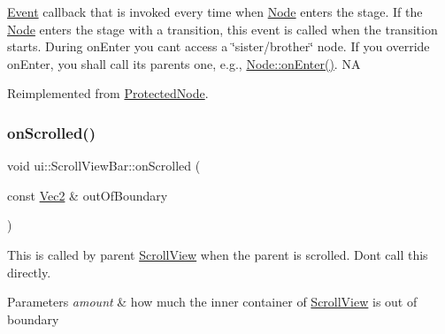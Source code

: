 \hyperlink{classEvent}{Event} callback that is invoked every time when \hyperlink{classNode}{Node} enters the \textquotesingle{}stage\textquotesingle{}. If the \hyperlink{classNode}{Node} enters the \textquotesingle{}stage\textquotesingle{} with a transition, this event is called when the transition starts. During on\+Enter you can\textquotesingle{}t access a \char`\"{}sister/brother\char`\"{} node. If you override on\+Enter, you shall call its parent\textquotesingle{}s one, e.\+g., \hyperlink{classNode_a7f51764c4afd5018a052b9ef71c03374}{Node\+::on\+Enter()}.  NA 

Reimplemented from \hyperlink{classProtectedNode_ade991090bee4173b4e1f47382adc99b9}{Protected\+Node}.

\mbox{\label{classui_1_1ScrollViewBar_a7a42d2973e1b1bb1cdd2c48b121ed190}} 
\subsubsection{\texorpdfstring{on\+Scrolled()}{onScrolled()}\hspace{0.1cm}{\footnotesize\ttfamily [1/2]}}
{\footnotesize\ttfamily void ui\+::\+Scroll\+View\+Bar\+::on\+Scrolled (\begin{DoxyParamCaption}\item[{const \hyperlink{classVec2}{Vec2} \&}]{out\+Of\+Boundary }\end{DoxyParamCaption})\hspace{0.3cm}{\ttfamily [virtual]}}



This is called by parent \hyperlink{classui_1_1ScrollView}{Scroll\+View} when the parent is scrolled. Don\textquotesingle{}t call this directly. 


\begin{DoxyParams}{Parameters}
{\em amount} & how much the inner container of \hyperlink{classui_1_1ScrollView}{Scroll\+View} is out of boundary \\
\hline
\end{DoxyParams}
\mbox{\label{classui_1_1ScrollViewBar_af2d1be8e9fa57dac40a8eaac5e05c3f0}} 
